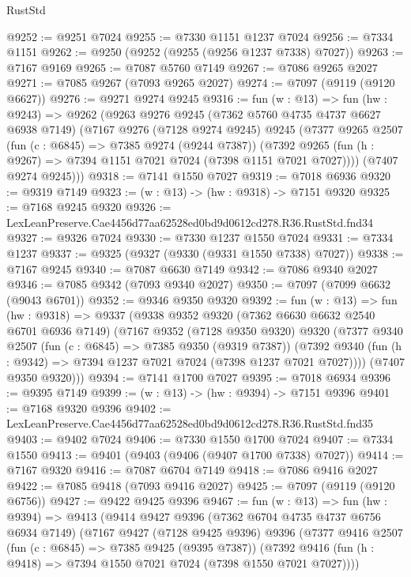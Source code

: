 \begin{lexlean}{RustStd}
\begin{coremodule}
@9252 := @9251 @7024
@9255 := @7330 @1151 @1237 @7024
@9256 := @7334 @1151
@9262 := @9250 (@9252 (@9255 (@9256 @1237 @7338) @7027))
@9263 := @7167 @9169
@9265 := @7087 @5760 @7149
@9267 := @7086 @9265 @2027
@9271 := @7085 @9267 (@7093 @9265 @2027)
@9274 := @7097 (@9119 (@9120 @6627))
@9276 := @9271 @9274 @9245
@9316 := fun (w : @13) =>
  fun (hw : @9243) =>
  @9262
    (@9263
      @9276
      @9245
      (@7362 @5760 @4735 @4737 @6627 @6938 @7149)
      (@7167
        @9276
        (@7128 @9274 @9245)
        @9245
        (@7377
          @9265
          @2507
          (fun (c : @6845) => @7385 @9274 (@9244 @7387))
          (@7392 @9265 (fun (h : @9267) => @7394 @1151 @7021 @7024 (@7398 @1151 @7021 @7027))))
        (@7407 @9274 @9245)))
@9318 := @7141 @1550 @7027
@9319 := @7018 @6936
@9320 := @9319 @7149
@9323 := (w : @13) -> (hw : @9318) -> @7151 @9320
@9325 := @7168 @9245 @9320
@9326 := LexLeanPreserve.Cae4456d77aa62528ed0bd9d0612cd278.R36.RustStd.fnd34
@9327 := @9326 @7024
@9330 := @7330 @1237 @1550 @7024
@9331 := @7334 @1237
@9337 := @9325 (@9327 (@9330 (@9331 @1550 @7338) @7027))
@9338 := @7167 @9245
@9340 := @7087 @6630 @7149
@9342 := @7086 @9340 @2027
@9346 := @7085 @9342 (@7093 @9340 @2027)
@9350 := @7097 (@7099 @6632 (@9043 @6701))
@9352 := @9346 @9350 @9320
@9392 := fun (w : @13) =>
  fun (hw : @9318) =>
  @9337
    (@9338
      @9352
      @9320
      (@7362 @6630 @6632 @2540 @6701 @6936 @7149)
      (@7167
        @9352
        (@7128 @9350 @9320)
        @9320
        (@7377
          @9340
          @2507
          (fun (c : @6845) => @7385 @9350 (@9319 @7387))
          (@7392 @9340 (fun (h : @9342) => @7394 @1237 @7021 @7024 (@7398 @1237 @7021 @7027))))
        (@7407 @9350 @9320)))
@9394 := @7141 @1700 @7027
@9395 := @7018 @6934
@9396 := @9395 @7149
@9399 := (w : @13) -> (hw : @9394) -> @7151 @9396
@9401 := @7168 @9320 @9396
@9402 := LexLeanPreserve.Cae4456d77aa62528ed0bd9d0612cd278.R36.RustStd.fnd35
@9403 := @9402 @7024
@9406 := @7330 @1550 @1700 @7024
@9407 := @7334 @1550
@9413 := @9401 (@9403 (@9406 (@9407 @1700 @7338) @7027))
@9414 := @7167 @9320
@9416 := @7087 @6704 @7149
@9418 := @7086 @9416 @2027
@9422 := @7085 @9418 (@7093 @9416 @2027)
@9425 := @7097 (@9119 (@9120 @6756))
@9427 := @9422 @9425 @9396
@9467 := fun (w : @13) =>
  fun (hw : @9394) =>
  @9413
    (@9414
      @9427
      @9396
      (@7362 @6704 @4735 @4737 @6756 @6934 @7149)
      (@7167
        @9427
        (@7128 @9425 @9396)
        @9396
        (@7377
          @9416
          @2507
          (fun (c : @6845) => @7385 @9425 (@9395 @7387))
          (@7392 @9416 (fun (h : @9418) => @7394 @1550 @7021 @7024 (@7398 @1550 @7021 @7027))))

\end{coremodule}
\end{lexlean}
